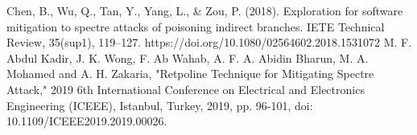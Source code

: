 \documentclass[lettersize,compsoc]{IEEEtran}
\begin{document}
\begin{thebibliography}{2}
 Chen, B., Wu, Q., Tan, Y., Yang, L., & Zou, P. (2018). Exploration for software mitigation to spectre attacks of poisoning indirect branches. IETE Technical Review, 35(sup1), 119–127. https://doi.org/10.1080/02564602.2018.1531072
 M. F. Abdul Kadir, J. K. Wong, F. Ab Wahab, A. F. A. Abidin Bharun, M. A. Mohamed and A. H. Zakaria, "Retpoline Technique for Mitigating Spectre Attack," 2019 6th International Conference on Electrical and Electronics Engineering (ICEEE), Istanbul, Turkey, 2019, pp. 96-101, doi: 10.1109/ICEEE2019.2019.00026.

\end{thebibliography}
\end{document}
